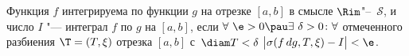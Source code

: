 \label{Stil}
	Функция $f$ интегрируема по функции $g$ на отрезке $[a,b]$ в смысле $\Rim$"--~$\mathcal S$, и число $I$ "--- интеграл $f$ по $g$
	на $[a,b]$, если $\forall\ \e>0\pau\exists\ \delta>0\colon \forall$ отмеченного разбиения
$\T=(T,\xi)$ отрезка $[a,b]$ с~$\diam T<\delta$
	$\big|\sigma(f\,dg,T,\xi)-I\big|<\e$.
	